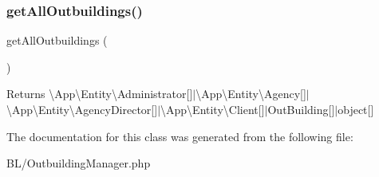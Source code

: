 \subsubsection{\texorpdfstring{getAllOutbuildings()}{getAllOutbuildings()}}
{\footnotesize\ttfamily get\+All\+Outbuildings (\begin{DoxyParamCaption}{ }\end{DoxyParamCaption})}

\begin{DoxyReturn}{Returns}
\textbackslash{}\+App\textbackslash{}\+Entity\textbackslash{}\+Administrator\mbox{[}\mbox{]}$\vert$\textbackslash{}\+App\textbackslash{}\+Entity\textbackslash{}\+Agency\mbox{[}\mbox{]}$\vert$\textbackslash{}\+App\textbackslash{}\+Entity\textbackslash{}\+Agency\+Director\mbox{[}\mbox{]}$\vert$\textbackslash{}\+App\textbackslash{}\+Entity\textbackslash{}\+Client\mbox{[}\mbox{]}$\vert$\+Out\+Building\mbox{[}\mbox{]}$\vert$object\mbox{[}\mbox{]} 
\end{DoxyReturn}


The documentation for this class was generated from the following file\+:\begin{DoxyCompactItemize}
\item 
B\+L/Outbuilding\+Manager.\+php\end{DoxyCompactItemize}
